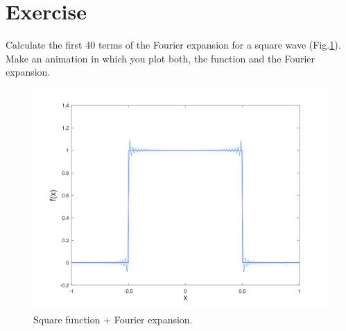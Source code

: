 \documentclass[12pt]{article}
\begin{document}


\section*{Exercise \theexample }
Calculate the first 40 terms of the Fourier expansion for a square wave (Fig.\ref{square}).
Make an animation in which you plot both, the function and the Fourier expansion.

\begin{figure}[h!]
  \begin{center}
    \includegraphics[height=4.in]{Solved/3/Animation4/00040.png}
    \caption{Square function + Fourier expansion.}  
    \label{square}
  \end{center}
\end{figure}





\end{document}
